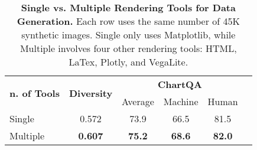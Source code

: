 \begin{table}[H]
    \small
    \centering
    \setlength{\tabcolsep}{4pt}
    \begin{tabular}{lccccc}
        \toprule
        \multirow{2}{*}{\textbf{n. of Tools}} & \multirow{2}{*}{\textbf{Diversity}} & \multicolumn{3}{c}{\textbf{ChartQA}} \\ \cmidrule{3-5}
        & & Average & Machine & Human \\
        \midrule
        Single & 0.572 & 73.9 & 66.5 & 81.5 \\ 
        Multiple & \textbf{0.607} & \textbf{75.2} & \textbf{68.6} & \textbf{82.0}\\
        \bottomrule
    \end{tabular}
    \vspace{-.1cm}
    \caption{\textbf{Single vs. Multiple Rendering Tools for Data Generation.} Each row uses the same number of 45K synthetic images. Single only uses Matplotlib, while Multiple involves four other rendering tools: HTML, LaTex, Plotly, and VegaLite. }
    \label{tab:diversity_performance}
    \vspace{-.3cm}
\end{table}